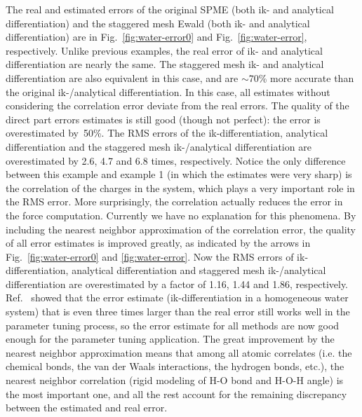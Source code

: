 \documentclass[aps,pre,preprint,unsortedaddress]{revtex4}
\begin{document}
The real and estimated errors of the original SPME
(both ik- and analytical differentiation)
and the staggered mesh Ewald (both ik- and analytical differentiation)
are in Fig.~\ref{fig:water-error0}
and Fig.~\ref{fig:water-error}, respectively.
Unlike previous examples, the real error of ik- and analytical differentiation
are nearly the same.
The staggered mesh ik- and analytical differentiation
are also equivalent in this case, and are $\sim$70\% more accurate
than the original ik-/analytical differentiation.
In this case,
all estimates without considering the correlation error
deviate from the real errors.
The quality of the direct
part errors estimates is still good (though not perfect):
the error is overestimated by~50\%.
The RMS errors of the ik-differentiation, analytical differentiation
and the staggered mesh ik-/analytical differentiation are
overestimated by 2.6, 4.7 and 6.8 times, respectively.
Notice the only difference between this example
and example 1 (in which the estimates were very sharp) is the correlation
of the charges in the system,
which plays a very important role in the RMS error. 
More surprisingly, the correlation
actually  reduces the error in the force computation.
Currently we have no explanation for this phenomena.
By including the nearest neighbor approximation of the
correlation error, the quality of all error estimates is improved greatly,
as indicated by the arrows in Fig.~\ref{fig:water-error0} and \ref{fig:water-error}.
Now the RMS errors of ik-differentiation, analytical differentiation
and staggered mesh ik-/analytical differentiation
are overestimated by a factor of 1.16, 1.44 and 1.86,
respectively.
Ref.~\cite{wang2010optimizing} showed that the error estimate
(ik-differentiation in a homogeneous water system) that
is even three times larger than the real error
still works well in the parameter tuning process, 
so the error estimate for  all methods are now good enough
for the parameter tuning application.
The great improvement by the nearest neighbor approximation 
means that  among all atomic
correlates (i.e. the chemical bonds, the van der Waals interactions,
the hydrogen bonds, etc.), the nearest neighbor correlation (rigid
modeling of H-O bond and H-O-H angle)
is the most important one, and all
the rest account for the remaining discrepancy between the estimated and real
error.
\end{document}
